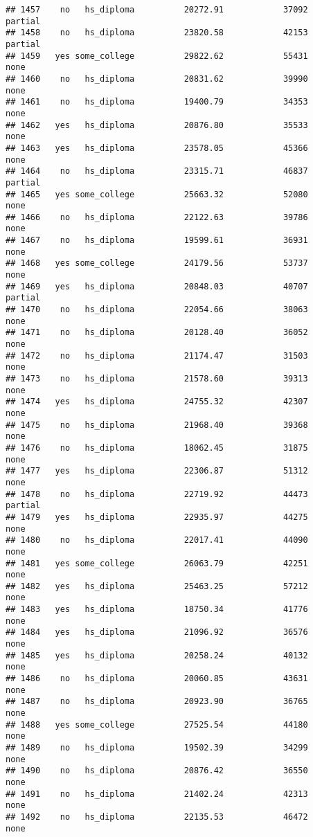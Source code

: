\documentclass[
]{article}
\begin{document}
\begin{verbatim}
## 1457    no   hs_diploma          20272.91            37092     partial
## 1458    no   hs_diploma          23820.58            42153     partial
## 1459   yes some_college          29822.62            55431        none
## 1460    no   hs_diploma          20831.62            39990        none
## 1461    no   hs_diploma          19400.79            34353        none
## 1462   yes   hs_diploma          20876.80            35533        none
## 1463   yes   hs_diploma          23578.05            45366        none
## 1464    no   hs_diploma          23315.71            46837     partial
## 1465   yes some_college          25663.32            52080        none
## 1466    no   hs_diploma          22122.63            39786        none
## 1467    no   hs_diploma          19599.61            36931        none
## 1468   yes some_college          24179.56            53737        none
## 1469   yes   hs_diploma          20848.03            40707     partial
## 1470    no   hs_diploma          22054.66            38063        none
## 1471    no   hs_diploma          20128.40            36052        none
## 1472    no   hs_diploma          21174.47            31503        none
## 1473    no   hs_diploma          21578.60            39313        none
## 1474   yes   hs_diploma          24755.32            42307        none
## 1475    no   hs_diploma          21968.40            39368        none
## 1476    no   hs_diploma          18062.45            31875        none
## 1477   yes   hs_diploma          22306.87            51312        none
## 1478    no   hs_diploma          22719.92            44473     partial
## 1479   yes   hs_diploma          22935.97            44275        none
## 1480    no   hs_diploma          22017.41            44090        none
## 1481   yes some_college          26063.79            42251        none
## 1482   yes   hs_diploma          25463.25            57212        none
## 1483   yes   hs_diploma          18750.34            41776        none
## 1484   yes   hs_diploma          21096.92            36576        none
## 1485   yes   hs_diploma          20258.24            40132        none
## 1486    no   hs_diploma          20060.85            43631        none
## 1487    no   hs_diploma          20923.90            36765        none
## 1488   yes some_college          27525.54            44180        none
## 1489    no   hs_diploma          19502.39            34299        none
## 1490    no   hs_diploma          20876.42            36550        none
## 1491    no   hs_diploma          21402.24            42313        none
## 1492    no   hs_diploma          22135.53            46472        none

\end{verbatim}
\end{document}

